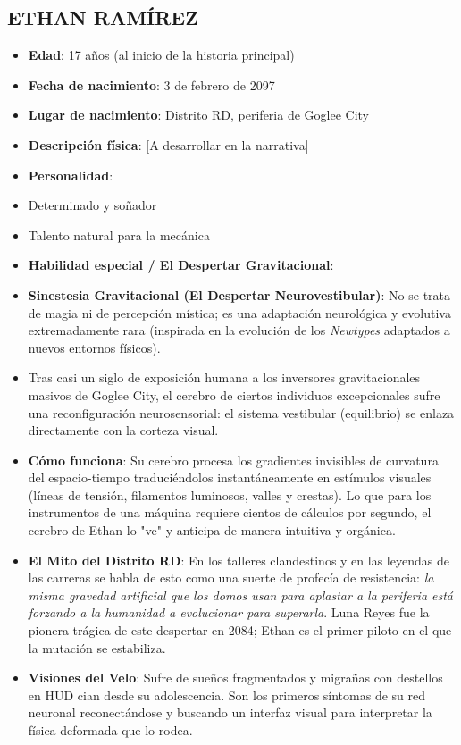 \documentclass[11pt,a4paper]{report}
\begin{document}
\subsection{ETHAN RAMÍREZ}
\begin{itemize}
  \item \textbf{Edad}: 17 años (al inicio de la historia principal)
  \item \textbf{Fecha de nacimiento}: 3 de febrero de 2097
  \item \textbf{Lugar de nacimiento}: Distrito RD, periferia de Goglee City
  \item \textbf{Descripción física}: [A desarrollar en la narrativa]
  \item \textbf{Personalidad}: 
  \item Determinado y soñador
  \item Talento natural para la mecánica
  \item \textbf{Habilidad especial / El Despertar Gravitacional}:
  \item \textbf{Sinestesia Gravitacional (El Despertar Neurovestibular)}: No se trata de magia ni de percepción mística; es una adaptación neurológica y evolutiva extremadamente rara (inspirada en la evolución de los \textit{Newtypes} adaptados a nuevos entornos físicos). 
  \item Tras casi un siglo de exposición humana a los inversores gravitacionales masivos de Goglee City, el cerebro de ciertos individuos excepcionales sufre una reconfiguración neurosensorial: el sistema vestibular (equilibrio) se enlaza directamente con la corteza visual.
  \item \textbf{Cómo funciona}: Su cerebro procesa los gradientes invisibles de curvatura del espacio-tiempo traduciéndolos instantáneamente en estímulos visuales (líneas de tensión, filamentos luminosos, valles y crestas). Lo que para los instrumentos de una máquina requiere cientos de cálculos por segundo, el cerebro de Ethan lo "ve" y anticipa de manera intuitiva y orgánica.
  \item \textbf{El Mito del Distrito RD}: En los talleres clandestinos y en las leyendas de las carreras se habla de esto como una suerte de profecía de resistencia: \textit{la misma gravedad artificial que los domos usan para aplastar a la periferia está forzando a la humanidad a evolucionar para superarla}. Luna Reyes fue la pionera trágica de este despertar en 2084; Ethan es el primer piloto en el que la mutación se estabiliza.
  \item \textbf{Visiones del Velo}: Sufre de sueños fragmentados y migrañas con destellos en HUD cian desde su adolescencia. Son los primeros síntomas de su red neuronal reconectándose y buscando un interfaz visual para interpretar la física deformada que lo rodea.

\end{itemize}
\end{document}
